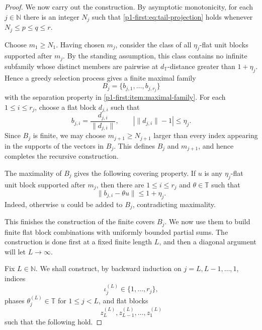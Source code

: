 \documentclass[10pt,a4paper]{amsart}
\newcommand{\N}{\mathbb N}
\newcommand{\T}{\mathbb T}
\newcommand{\distT}{d_{\mathbb T}}
\begin{document}
\begin{proof}
We now carry out the construction. By asymptotic monotonicity, for each $j\in\N$ there is an integer $N_j$ such that \eqref{p1-first:eq:tail-projection} holds whenever $N_j\leq p\leq q\leq r$.

Choose $m_1\geq N_1$. Having chosen $m_j$, consider the class of all $\eta_j$-flat unit blocks supported after $m_j$. By the standing assumption, this class contains no infinite subfamily whose distinct members are pairwise at $\distT$-distance greater than $1+\eta_j$. Hence a greedy selection process gives a finite maximal family
\begin{equation*}
        B_j=\{b_{j,1},\ldots,b_{j,r_j}\}
\end{equation*}
with the separation property in \ref{p1-first:item:maximal-family}. For each $1\leq i\leq r_j$, choose a flat block $d_{j,i}$ such that
\begin{equation}
\label{p1-first:eq:representing-block}
        b_{j,i}=\frac{d_{j,i}}{\|d_{j,i}\|}, \qquad |\|d_{j,i}\|-1|\leq \eta_j.
\end{equation}
Since $B_j$ is finite, we may choose $m_{j+1}\geq N_{j+1}$ larger than every index appearing in the supports of the vectors in $B_j$. This defines $B_j$ and $m_{j+1}$, and hence completes the recursive construction.

The maximality of $B_j$ gives the following covering property. If $u$ is any $\eta_j$-flat unit block supported after $m_j$, then there are $1\leq i\leq r_j$ and $\theta\in\T$ such that
\begin{equation}
\label{p1-first:eq:covering}
        \|b_{j,i}-\theta u\|\leq 1+\eta_j.
\end{equation}
Indeed, otherwise $u$ could be added to $B_j$, contradicting maximality.

This finishes the construction of the finite covers $B_j$. We now use them to build finite flat block combinations with uniformly bounded partial sums. The construction is done first at a fixed finite length $L$, and then a diagonal argument will let $L\to\infty$.

Fix $L\in\N$. We shall construct, by backward induction on $j=L,L-1,\ldots,1$, indices
\begin{equation*}
        \iota_j^{(L)}\in\{1,\ldots,r_j\},
\end{equation*}
phases $\theta_j^{(L)}\in\T$ for $1\leq j<L$, and flat blocks
\begin{equation*}
        z_L^{(L)},z_{L-1}^{(L)},\ldots,z_1^{(L)}
\end{equation*}
such that the following hold.


\end{proof}
\end{document}
